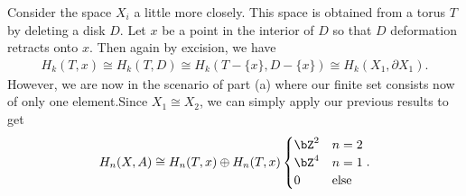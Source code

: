 \begin{homework}[e]
\begin{prf}
\begin{enumerate}[(a)]
      Consider the space $X_i$ a little more closely. This space is obtained from a torus $T$ by deleting a disk $D$. Let $x$ be a point in the interior of $D$ so that $D$ deformation retracts onto $x$. Then again by excision, we have
      \begin{align*}
        H_k(T,x) \cong H_k(T,D) \cong H_k(T - \{x\}, D - \{x\}) \cong H_k(X_1,\partial X_1).
      \end{align*}
      However, we are now in the scenario of part (a)  where our finite set consists now of only one element.Since $X_1 \cong X_2$, we can simply apply our previous results to get
      \begin{align*}
        H_n(X,A) \cong H_n(T,x) \oplus H_n(T,x)
        \begin{cases}
          \bZ^{2} & n = 2 \\
          \bZ^{4} & n = 1 \\
          0 & \text{else}
        \end{cases}.
      \end{align*}

      \bigskip


\end{enumerate}
\end{prf}
\end{homework}
